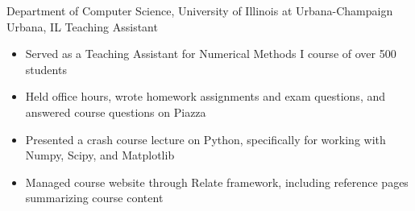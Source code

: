 
        {Department of Computer Science, University of Illinois at Urbana-Champaign}
        {Urbana, IL}
        {Teaching Assistant}
        {}{
    \begin{itemize}
        \item Served as a Teaching Assistant for Numerical Methods I course of over 500 students
        \item Held office hours, wrote homework assignments and exam questions, and answered course questions on Piazza
        \item Presented a crash course lecture on Python, specifically for working with Numpy, Scipy, and Matplotlib
        \item Managed course website through Relate framework, including reference pages summarizing course content
    \end{itemize}
}
